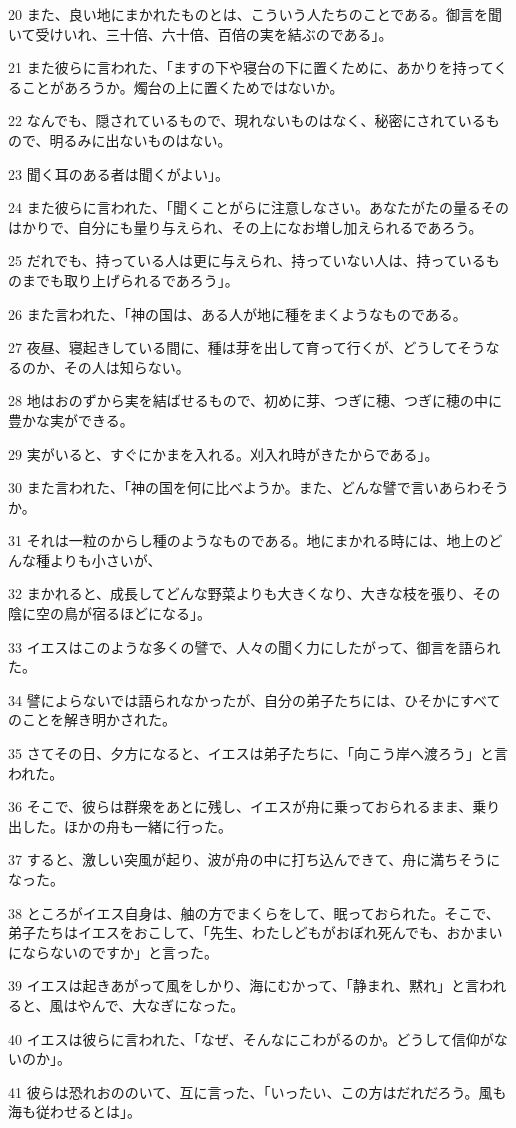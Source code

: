 \par 20 また、良い地にまかれたものとは、こういう人たちのことである。御言を聞いて受けいれ、三十倍、六十倍、百倍の実を結ぶのである」。
\par 21 また彼らに言われた、「ますの下や寝台の下に置くために、あかりを持ってくることがあろうか。燭台の上に置くためではないか。
\par 22 なんでも、隠されているもので、現れないものはなく、秘密にされているもので、明るみに出ないものはない。
\par 23 聞く耳のある者は聞くがよい」。
\par 24 また彼らに言われた、「聞くことがらに注意しなさい。あなたがたの量るそのはかりで、自分にも量り与えられ、その上になお増し加えられるであろう。
\par 25 だれでも、持っている人は更に与えられ、持っていない人は、持っているものまでも取り上げられるであろう」。
\par 26 また言われた、「神の国は、ある人が地に種をまくようなものである。
\par 27 夜昼、寝起きしている間に、種は芽を出して育って行くが、どうしてそうなるのか、その人は知らない。
\par 28 地はおのずから実を結ばせるもので、初めに芽、つぎに穂、つぎに穂の中に豊かな実ができる。
\par 29 実がいると、すぐにかまを入れる。刈入れ時がきたからである」。
\par 30 また言われた、「神の国を何に比べようか。また、どんな譬で言いあらわそうか。
\par 31 それは一粒のからし種のようなものである。地にまかれる時には、地上のどんな種よりも小さいが、
\par 32 まかれると、成長してどんな野菜よりも大きくなり、大きな枝を張り、その陰に空の鳥が宿るほどになる」。
\par 33 イエスはこのような多くの譬で、人々の聞く力にしたがって、御言を語られた。
\par 34 譬によらないでは語られなかったが、自分の弟子たちには、ひそかにすべてのことを解き明かされた。
\par 35 さてその日、夕方になると、イエスは弟子たちに、「向こう岸へ渡ろう」と言われた。
\par 36 そこで、彼らは群衆をあとに残し、イエスが舟に乗っておられるまま、乗り出した。ほかの舟も一緒に行った。
\par 37 すると、激しい突風が起り、波が舟の中に打ち込んできて、舟に満ちそうになった。
\par 38 ところがイエス自身は、舳の方でまくらをして、眠っておられた。そこで、弟子たちはイエスをおこして、「先生、わたしどもがおぼれ死んでも、おかまいにならないのですか」と言った。
\par 39 イエスは起きあがって風をしかり、海にむかって、「静まれ、黙れ」と言われると、風はやんで、大なぎになった。
\par 40 イエスは彼らに言われた、「なぜ、そんなにこわがるのか。どうして信仰がないのか」。
\par 41 彼らは恐れおののいて、互に言った、「いったい、この方はだれだろう。風も海も従わせるとは」。

